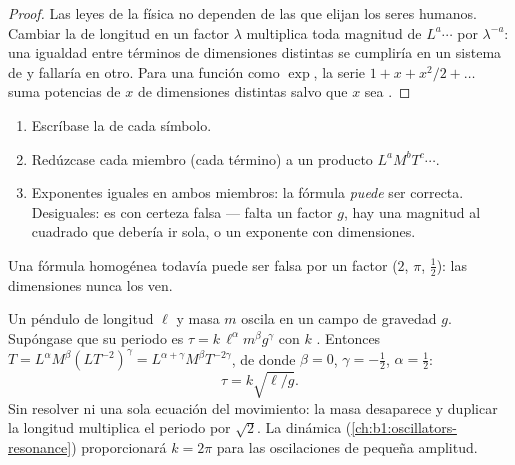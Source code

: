 \begin{proof}
Las leyes de la física no dependen de las  que elijan los seres
humanos. Cambiar la  de longitud en un factor $\lambda$ multiplica
toda magnitud de  $L^a \cdots$ por $\lambda^{-a}$: una igualdad
entre términos de dimensiones distintas se cumpliría en un sistema de
 y fallaría en otro. Para una función como $\exp$, la serie
$1 + x + x^2/2 + \dots$ suma potencias de $x$ de dimensiones distintas
salvo que $x$ sea .
\end{proof}

\begin{method}\label{met:b1:units-dimensions:check}
\begin{enumerate}
  \item Escríbase la  de cada símbolo.
  \item Redúzcase cada miembro (cada término) a un producto $L^a M^b T^c \cdots$.
  \item Exponentes iguales en ambos miembros: la fórmula \emph{puede} ser
        correcta. Desiguales: es con certeza falsa --- falta un factor
        $g$, hay una magnitud al cuadrado que debería ir sola, o un
        exponente con dimensiones.
\end{enumerate}
Una fórmula homogénea todavía puede ser falsa por un factor 
($2$, $\pi$, $\tfrac12$): las dimensiones nunca los ven.
\end{method}

\begin{example}\label{ex:b1:units-dimensions:pendulum}
Un péndulo de longitud $\ell$ y masa $m$ oscila en un campo de gravedad
$g$. Supóngase que su periodo es $\tau = k\,\ell^\alpha m^\beta g^\gamma$
con $k$ . Entonces $T = L^\alpha M^\beta (L T^{-2})^\gamma =
L^{\alpha+\gamma} M^\beta T^{-2\gamma}$, de donde $\beta = 0$,
$\gamma = -\tfrac12$, $\alpha = \tfrac12$:
\[
\tau = k\sqrt{\ell/g} .
\]
Sin resolver ni una sola ecuación del movimiento: la masa desaparece y
duplicar la longitud multiplica el periodo por $\sqrt2$. La dinámica
(\cref{ch:b1:oscillators-resonance}) proporcionará $k = 2\pi$ para las
oscilaciones de pequeña amplitud.
\end{example}

